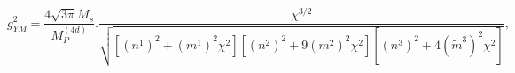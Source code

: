 \begin{equation}\label{coupling}
g_{YM}^2 = \frac{4\sqrt{3 \pi} M_s}{M_P^{(4d)}}.
\frac{\chi^{3/2}}{\sqrt{[(n^1)^2 + (m^1)^2 \chi^2][ (n^2)^2 + 9
(m^2)^2 \chi^2][(n^3)^2 + 4 (\tilde{m}^3)^2 \chi^2]}},
\end{equation}

